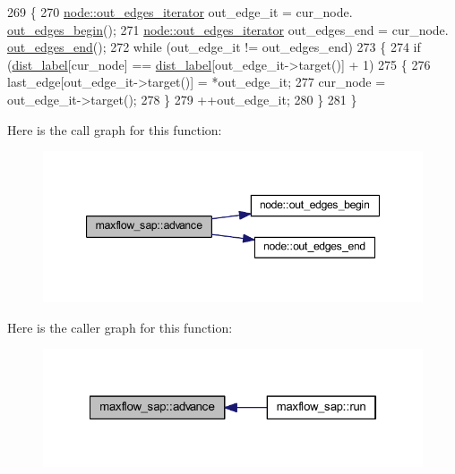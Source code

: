 \begin{DoxyCode}
269 \{
270     \mbox{\hyperlink{classnode_a90e17ed34de55072e8077f4367499a98}{node::out\_edges\_iterator}} out\_edge\_it = cur\_node.
      \mbox{\hyperlink{classnode_a7dcb80df22118cea04f77ca8c952d9c2}{out\_edges\_begin}}();
271     \mbox{\hyperlink{classnode_a90e17ed34de55072e8077f4367499a98}{node::out\_edges\_iterator}} out\_edges\_end = cur\_node.
      \mbox{\hyperlink{classnode_a7ce2ba5195a63d4df6b44299a02a9378}{out\_edges\_end}}();
272     \textcolor{keywordflow}{while} (out\_edge\_it != out\_edges\_end)
273     \{
274         \textcolor{keywordflow}{if} (\mbox{\hyperlink{classmaxflow__sap_a14eef09823ae0ac69348c2b3a60e6ca3}{dist\_label}}[cur\_node] == \mbox{\hyperlink{classmaxflow__sap_a14eef09823ae0ac69348c2b3a60e6ca3}{dist\_label}}[out\_edge\_it->target()] + 1)
275         \{
276             last\_edge[out\_edge\_it->target()] = *out\_edge\_it;
277             cur\_node = out\_edge\_it->target();
278         \}
279         ++out\_edge\_it;
280     \}
281 \}
\end{DoxyCode}
Here is the call graph for this function\+:\nopagebreak
\begin{figure}[H]
\begin{center}
\leavevmode
\includegraphics[width=347pt]{classmaxflow__sap_a0eb02b00fa0840cfad87eb6d67c9b849_cgraph}
\end{center}
\end{figure}
Here is the caller graph for this function\+:\nopagebreak
\begin{figure}[H]
\begin{center}
\leavevmode
\includegraphics[width=322pt]{classmaxflow__sap_a0eb02b00fa0840cfad87eb6d67c9b849_icgraph}
\end{center}
\end{figure}
\mbox{\label{classmaxflow__sap_a02f7814313a36b30bb99c40ead6c9ef5}} 
